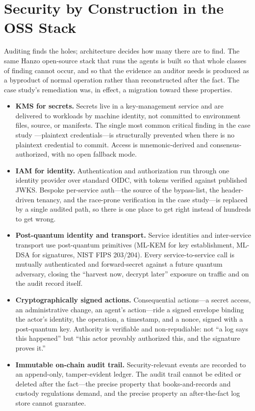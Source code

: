 \documentclass[11pt,letterpaper]{article}
\begin{document}
\section{Security by Construction in the OSS Stack}

Auditing finds the holes; architecture decides how many there are to find. The
same Hanzo open-source stack that runs the agents is built so that whole classes
of finding cannot occur, and so that the evidence an auditor needs is produced as
a byproduct of normal operation rather than reconstructed after the fact. The case
study's remediation was, in effect, a migration toward these properties.

\begin{itemize}
  \item \textbf{KMS for secrets.} Secrets live in a key-management service and are
  delivered to workloads by machine identity, not committed to environment files,
  source, or manifests. The single most common critical finding in the case study
  ---plaintext credentials---is structurally prevented when there is no plaintext
  credential to commit. Access is mnemonic-derived and consensus-authorized, with
  no open fallback mode.
  \item \textbf{IAM for identity.} Authentication and authorization run through one
  identity provider over standard OIDC, with tokens verified against published
  JWKS. Bespoke per-service auth---the source of the bypass-list, the
  header-driven tenancy, and the race-prone verification in the case study---is
  replaced by a single audited path, so there is one place to get right instead of
  hundreds to get wrong.
  \item \textbf{Post-quantum identity and transport.} Service identities and
  inter-service transport use post-quantum primitives (ML-KEM for key
  establishment, ML-DSA for signatures, NIST FIPS 203/204). Every service-to-service
  call is mutually authenticated and forward-secret against a future quantum
  adversary, closing the ``harvest now, decrypt later'' exposure on traffic and on
  the audit record itself.
  \item \textbf{Cryptographically signed actions.} Consequential actions---a
  secret access, an administrative change, an agent's action---ride a signed
  envelope binding the actor's identity, the operation, a timestamp, and a nonce,
  signed with a post-quantum key. Authority is verifiable and non-repudiable: not
  ``a log says this happened'' but ``this actor provably authorized this, and the
  signature proves it.''
  \item \textbf{Immutable on-chain audit trail.} Security-relevant events are
  recorded to an append-only, tamper-evident ledger. The audit trail cannot be
  edited or deleted after the fact---the precise property that books-and-records
  and custody regulations demand, and the precise property an after-the-fact log
  store cannot guarantee.
\end{itemize}
\end{document}
